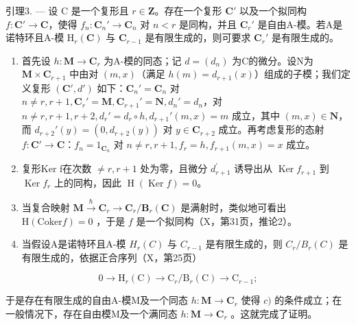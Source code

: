 引理3. --- 设 C 是一个复形且 \(r \in \mathbf{Z}\)。存在一个复形 \(\mathbf{C}'\) 以及一个拟同构 \(f: \mathbf{C}' \to \mathbf{C}\)，使得 \(f_n: \mathbf{C}_n' \to \mathbf{C}_n\) 对 \(n < r\) 是同构，并且 \(\mathbf{C}_r'\) 是自由A-模。若A是诺特环且A-模 \(\mathrm{H}_r(\mathbf{C})\) 与 \(\mathbf{C}_{r-1}\) 是有限生成的，则可要求 \(\mathbf{C}_r'\) 是有限生成的。

\begin{enumerate}
\def\labelenumi{\alph{enumi})}
\item
  首先设 \(h: \mathbf{M} \to \mathbf{C}_r\) 为A-模的同态；记 \(d = (d_n)\) 为C的微分。设N为 \(\mathbf{M} \times \mathbf{C}_{r+1}\) 中由对 \((m, x)\)（满足 \(h(m) = d_{r+1}(x)\)）组成的子模；我们定义复形 \((\mathbf{C}', d')\) 如下：\(\mathbf{C}_n' = \mathbf{C}_n\) 对 \(n \neq r, r+1, \mathbf{C}_r' = \mathbf{M}, \mathbf{C}_{r+1}' = \mathbf{N}, d_n' = d_n\)，对 \(n \neq r, r+1, r+2, d_r' = d_r \circ h, d_{r+1}'(m, x) = m\) 成立，其中 \((m, x) \in \mathbf{N}\)，而 \(d_{r+2}'(y) = (0, d_{r+2}(y))\) 对 \(y \in \mathbf{C}_{r+2}\) 成立。再考虑复形的态射 \(f: \mathbf{C}' \to \mathbf{C}\)：\(f_n = 1_{\mathbf{C}_n}\) 对 \(n \neq r, r+1, f_r = h, f_{r+1}(m, x) = x\) 成立。
\item
  复形Ker f在次数 \(\neq r, r + 1\) 处为零，且微分 \(d_{r+1}^{\prime}\) 诱导出从 \(\operatorname{Ker} f_{r+1}\) 到 \(\operatorname{Ker} f_r\) 上的同构，因此 \(\operatorname{H}(\operatorname{Ker} f) = 0\)。
\item
  当复合映射 \(\mathbf{M} \xrightarrow{\hbar} \mathbf{C}_r \to \mathbf{C}_r / \mathbf{B}_r(\mathbf{C})\) 是满射时，类似地可看出 \(\mathrm{H}(\mathrm{Coker}f) = 0\) ，于是 \(f\) 是一个拟同构（X，第31页，推论2）。
\item
  当假设A是诺特环且A-模 \(H_{r}(C)\) 与 \(C_{r-1}\) 是有限生成的，则 \(C_{r}/B_{r}(C)\) 是有限生成的，依据正合序列（X，第25页）
\end{enumerate}

\[
0 \to \mathrm{H} _ {r} (\mathrm{C}) \to \mathrm{C} _ {r} / \mathrm{B} _ {r} (\mathrm{C}) \to \mathrm{C} _ {r - 1};
\]

于是存在有限生成的自由A-模M及一个同态 \(h: \mathbf{M} \to \mathbf{C}_{r}\) 使得 \(c)\) 的条件成立；在一般情况下，存在自由模M及一个满同态 \(h: \mathbf{M} \to \mathbf{C}_{r}\) 。这就完成了证明。

